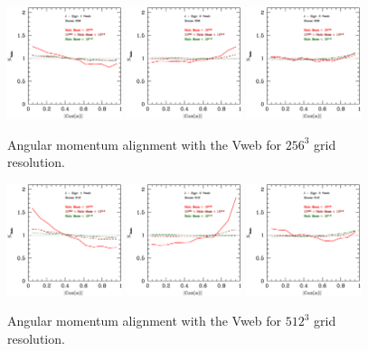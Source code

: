 \documentclass[usenatbib]{mn2e}
\begin{document}
\begin{figure}
\includegraphics[width=0.30\textwidth]{../plot2/J/256_J_V1.ps}
\includegraphics[width=0.30\textwidth]{../plot2/J/256_J_V2.ps}
\includegraphics[width=0.30\textwidth]{../plot2/J/256_J_V3.ps}
\caption{Angular momentum alignment with the Vweb for $256^3$ grid resolution.}
\end{figure}


\begin{figure}
\includegraphics[width=0.30\textwidth]{../plot2/J/512_J_V1.ps}
\includegraphics[width=0.30\textwidth]{../plot2/J/512_J_V2.ps}
\includegraphics[width=0.30\textwidth]{../plot2/J/512_J_V3.ps}
\caption{Angular momentum alignment with the Vweb for $512^3$ grid resolution.}
\end{figure}
\end{document}
